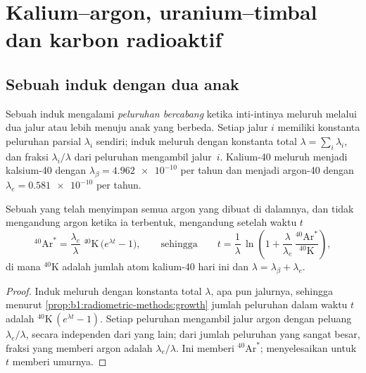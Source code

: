 \section{Kalium--argon, uranium--timbal dan karbon radioaktif}\label{sec:b1:radiometric-methods:kar}

\subsection*{Sebuah induk dengan dua anak}

\begin{definition}\label{def:b1:radiometric-methods:branching}
Sebuah induk mengalami \emph{peluruhan bercabang} ketika inti-intinya meluruh melalui dua jalur atau lebih menuju anak yang berbeda. Setiap jalur $i$ memiliki konstanta peluruhan parsial $\lambda_i$ sendiri; induk meluruh dengan konstanta total $\lambda = \sum_i \lambda_i$, dan fraksi $\lambda_i/\lambda$ dari peluruhan mengambil jalur~$i$. Kalium-40 meluruh menjadi kalsium-40 dengan $\lambda_\beta =
\num{4.962e-10}$ per tahun dan menjadi argon-40 dengan $\lambda_e = \num{0.581e-10}$ per
tahun.
\end{definition}

\begin{proposition}\label{prop:b1:radiometric-methods:kar}
Sebuah  yang telah menyimpan semua argon yang dibuat di dalamnya, dan tidak mengandung argon ketika ia terbentuk, mengandung setelah waktu $t$
\[
  {}^{40}\mathrm{Ar}^* = \frac{\lambda_e}{\lambda}\;{}^{40}\mathrm{K}\,\bigl(e^{\lambda t} - 1\bigr),
  \qquad\text{sehingga}\qquad
  t = \frac{1}{\lambda}\,\ln\!\left(1 + \frac{\lambda}{\lambda_e}\,
      \frac{{}^{40}\mathrm{Ar}^*}{{}^{40}\mathrm{K}}\right),
\]
di mana ${}^{40}\mathrm{K}$ adalah jumlah atom kalium-40 hari ini dan $\lambda =
\lambda_\beta + \lambda_e$.
\end{proposition}

\begin{proof}
Induk meluruh dengan konstanta total $\lambda$, apa pun jalurnya, sehingga menurut \cref{prop:b1:radiometric-methods:growth} jumlah peluruhan dalam waktu $t$ adalah
${}^{40}\mathrm{K}\,(e^{\lambda t} - 1)$. Setiap peluruhan mengambil jalur argon dengan peluang $\lambda_e/\lambda$, secara independen dari yang lain; dari jumlah peluruhan yang sangat besar, fraksi yang memberi argon adalah $\lambda_e/\lambda$. Ini memberi ${}^{40}\mathrm{Ar}^*$; menyelesaikan untuk $t$ memberi umurnya.
\end{proof}

